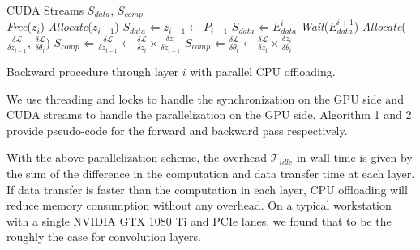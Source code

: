 \documentclass[11pt,onecolumn]{article}
\begin{document}
\begin{algorithm}[h]
     	\\ \hspace{1.1cm} CUDA Streams $S_{data}$, $S_{comp}$%
	\vspace{1mm} \\
	\vspace{1mm}
	\textit{Free}($z_{i}$)\;
	\textit{Allocate}($z_{i-1}$)\;
	\vspace{1mm}
	$S_{data} \Leftarrow z_{i-1} \leftarrow P_{i-1}$\;
	$S_{data} \Leftarrow E_{data}^i$\;
	\vspace{1mm}
	\textit{Wait}($E_{data}^{i+1}$)\;
	\textit{Allocate}($\frac{\delta \mathcal{L}}{\delta z_{i-1}}$, $\frac{\delta \mathcal{L}}{\delta \theta_i}$)\;
	\vspace{1mm}
	$S_{comp} \Leftarrow \frac{\delta \mathcal{L}}{\delta z_{i-1}} \leftarrow \frac{\delta \mathcal{L}}{\delta z_{i}}  \times \frac{\delta z_{i}}{\delta z_{i-1}}$\;
	$S_{comp} \Leftarrow \frac{\delta \mathcal{L}}{\delta \theta_i} \leftarrow \frac{\delta \mathcal{L}}{\delta z_{i}}  \times \frac{\delta z_{i}}{\delta \theta_i}$\;
	\caption{Backward procedure through layer $i$ with parallel CPU offloading.}
\end{algorithm}



We use threading and locks to handle the synchronization on the GPU side 
and CUDA streams to handle the parallelization on the GPU side. 
Algorithm 1 and 2 provide pseudo-code for the forward and backward pass respectively.

With the above parallelization scheme, the overhead $\mathcal{T}_{idle}$ in wall time 
is given by the sum of the difference in the computation and data transfer time at each layer.
If data transfer is faster than the computation in each layer, 
CPU offloading will reduce memory consumption without any overhead.
On a typical workstation with a single NVIDIA GTX 1080 Ti and PCIe lanes,
we found that to be the roughly the case for convolution layers.
\end{document}
